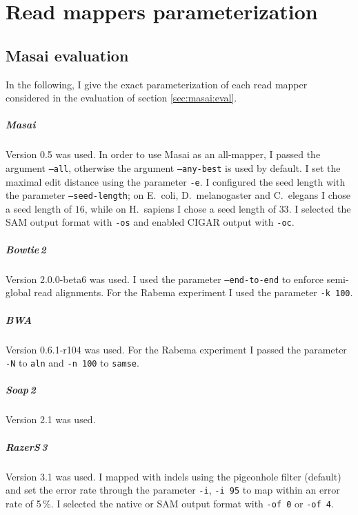 \chapter{Read mappers parameterization}

\section{Masai evaluation}
\label{sup:masai:param}

In the following, I give the exact parameterization of each read mapper considered in the evaluation of section \ref{sec:masai:eval}.

\paragraph{Masai}
Version 0.5 was used.
In order to use Masai as an all-mapper, I passed the argument \texttt{--all}, otherwise the argument \texttt{--any-best} is used by default.
I set the maximal edit distance using the parameter \texttt{-e}.
I configured the seed length with the parameter \texttt{--seed-length}; on E.~coli, D.~melanogaster and C.~elegans I chose a seed length of $16$, while on H.~sapiens I chose a seed length of $33$.
I selected the SAM output format with \texttt{-os} and enabled CIGAR output with \texttt{-oc}.

\paragraph{Bowtie\,2}
Version 2.0.0-beta6 was used.
I used the parameter \texttt{--end-to-end} to enforce semi-global read alignments.
For the Rabema experiment I used the parameter \texttt{-k 100}.

\paragraph{BWA}
Version 0.6.1-r104 was used.
For the Rabema experiment I passed the parameter \texttt{-N} to \texttt{aln} and \texttt{-n 100} to \texttt{samse}.

\paragraph{Soap\,2}
Version 2.1 was used.

\paragraph{RazerS\,3}
Version 3.1 was used.
I mapped with indels using the pigeonhole filter (default) and set the error rate through the parameter \texttt{-i}, \eg \texttt{-i 95} to map within an error rate of 5\,\%.
I selected the native or SAM output format with \texttt{-of 0} or \texttt{-of 4}.

